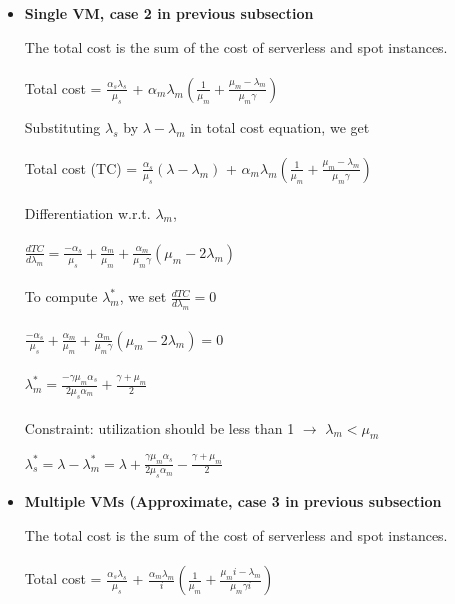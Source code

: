 \documentclass[letter,11pt]{article}
\begin{document}
\begin{itemize}
\item \textbf{Single VM, case 2 in previous subsection}

The total cost is the sum of the cost of serverless and spot instances. \\ \\
Total cost = $\frac{\alpha_s \lambda_s}{\mu_s}$ + $\alpha_m \lambda_m(\frac{1}{\mu_m} + \frac{\mu_m - \lambda_m}{\mu_m \gamma}) $

Substituting $\lambda_s$ by $\lambda - \lambda_m$ in total cost equation, we get\\ \\
Total cost (TC) = $\frac{\alpha_s}{\mu_s}(\lambda - \lambda_m)$ + $\alpha_m \lambda_m(\frac{1}{\mu_m} + \frac{\mu_m - \lambda_m}{\mu_m \gamma}) $ \\ \\
Differentiation w.r.t. $\lambda_m$, \\ \\
$\frac{d TC}{d \lambda_m} = \frac{- \alpha_s}{\mu_s} + \frac{\alpha_m}{\mu_m} + \frac{\alpha_m}{\mu_m \gamma}(\mu_m - 2 \lambda_m)$ \\ \\
To compute $\lambda_m^{*}$, we set $\frac{d TC}{d \lambda_m} = 0$ \\ \\
$\frac{- \alpha_s}{\mu_s} + \frac{\alpha_m}{\mu_m} + \frac{\alpha_m}{\mu_m \gamma}(\mu_m - 2 \lambda_m) = 0$ \\ \\ 
$\lambda_m^{*} = \frac{- \gamma \mu_m \alpha_s}{2 \mu_s \alpha_m} + \frac{\gamma + \mu_m}{2}$ \\ \\
Constraint: utilization should be less than 1 $\rightarrow$ $\lambda_m < \mu_m$

$\lambda_s^{*} = \lambda - \lambda_m^{*} = \lambda + \frac{\gamma \mu_m \alpha_s}{2 \mu_s \alpha_m} - \frac{\gamma + \mu_m}{2}$

\item \textbf{Multiple VMs (Approximate, case 3 in previous subsection}

The total cost is the sum of the cost of serverless and spot instances. \\ \\
Total cost = $\frac{\alpha_s \lambda_s}{\mu_s}$ + $\frac{\alpha_m \lambda_m}{i} (\frac{1}{\mu_m} + \frac{\mu_m i - \lambda_m}{\mu_m \gamma i})$


\end{itemize}
\end{document}
